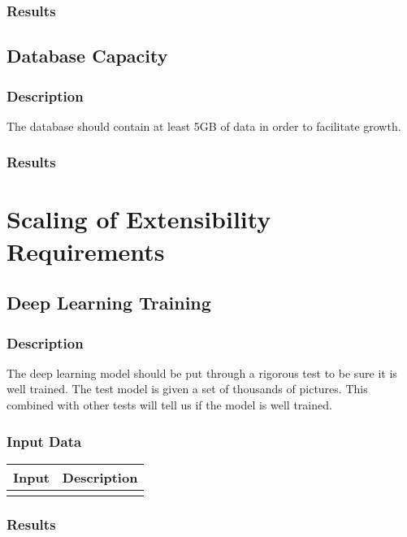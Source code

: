 \documentclass{scrreprt}
\begin{document}
\subsubsection{Results}

\subsection{Database Capacity}
\subsubsection{Description}
\begin{flushleft}
The database should contain at least 5GB of data in order to facilitate growth.
\end{flushleft}
\subsubsection{Results}

\section{Scaling of Extensibility Requirements}
\subsection{Deep Learning Training}
\subsubsection{Description}
\begin{flushleft}
The deep learning model should be put through a rigorous test to be sure it is well trained. The test model is given a set of thousands of pictures. This combined with other tests will tell us if the model is well trained.
\end{flushleft}
\subsubsection{Input Data}
 \centering
 \begin{tabular}{p{3cm}p{6cm}}
 \hline\hline
 Input & Description\\
 \hline\hline
   &  \\ %
 \hline
 \end{tabular}
\subsubsection{Results}
\end{document}
